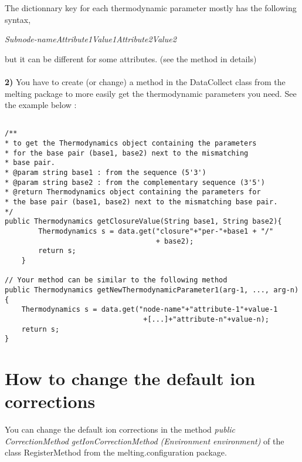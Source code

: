 \documentclass{article}
\begin{document}
The dictionnary key for each thermodynamic parameter mostly has the following syntax,

\textit{Subnode-nameAttribute1Value1Attribute2Value2}

 but it can be different for some attributes. (see the method in details)\\
\\
\textbf{2)} You have to create (or change) a method in the DataCollect class from the melting package
to more easily get the thermodynamic parameters you need. See the example below :

\begin{verbatim}

/**
* to get the Thermodynamics object containing the parameters 
* for the base pair (base1, base2) next to the mismatching 
* base pair.
* @param string base1 : from the sequence (5'3')
* @param string base2 : from the complementary sequence (3'5')
* @return Thermodynamics object containing the parameters for 
* the base pair (base1, base2) next to the mismatching base pair.
*/
public Thermodynamics getClosureValue(String base1, String base2){
		Thermodynamics s = data.get("closure"+"per-"+base1 + "/" 
		                            + base2);
		return s;
	}
	
// Your method can be similar to the following method
public Thermodynamics getNewThermodynamicParameter1(arg-1, ..., arg-n){
	Thermodynamics s = data.get("node-name"+"attribute-1"+value-1 
	                             +[...]+"attribute-n"+value-n);
	return s;
}

\end{verbatim}

\section{How to change the default ion corrections}

You can change the default ion corrections in the method 
\textit{public CorrectionMethod getIonCorrectionMethod (Environment environment)}
of the class RegisterMethod from the melting.configuration package.
\end{document}
